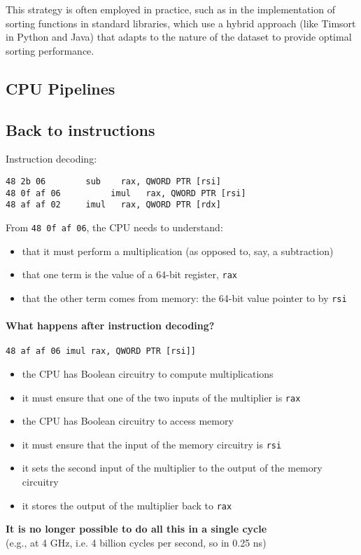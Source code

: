 \documentclass[12pt]{article}
\begin{document}
This strategy is often employed in practice, such as in the implementation of sorting functions in standard libraries, which use a hybrid approach (like Timsort in Python and Java) that adapts to the nature of the dataset to provide optimal sorting performance.

\subsection{CPU Pipelines}
\subsection{Back to instructions}

Instruction decoding:

\begin{verbatim}
48 2b 06        sub    rax, QWORD PTR [rsi]
48 0f af 06          imul   rax, QWORD PTR [rsi]
48 af af 02     imul   rax, QWORD PTR [rdx]
\end{verbatim}

From \texttt{48 0f af 06}, the CPU needs to understand:

\begin{itemize}
  \item that it must perform a multiplication (as opposed to, say, a subtraction)
  \item that one term is the value of a 64-bit register, \texttt{rax}
  \item that the other term comes from memory: the 64-bit value pointer to by \texttt{rsi}
\end{itemize}


\paragraph{What happens after instruction decoding?}
\texttt{48 af af 06     imul   rax, QWORD PTR [rsi]]}
\begin{itemize}
    \item the CPU has Boolean circuitry to compute multiplications
    \item it must ensure that one of the two inputs of the multiplier is \texttt{rax}
    \item the CPU has Boolean circuitry to access memory
    \item it must ensure that the input of the memory circuitry is \texttt{rsi}
    \item it sets the second input of the multiplier to the output of the memory circuitry
    \item it stores the output of the multiplier back to \texttt{rax}
\end{itemize}
\textbf{It is no longer possible to do all this in a single cycle} \\
(e.g., at 4 GHz, i.e. 4 billion cycles per second, so in 0.25 ns)
\end{document}
